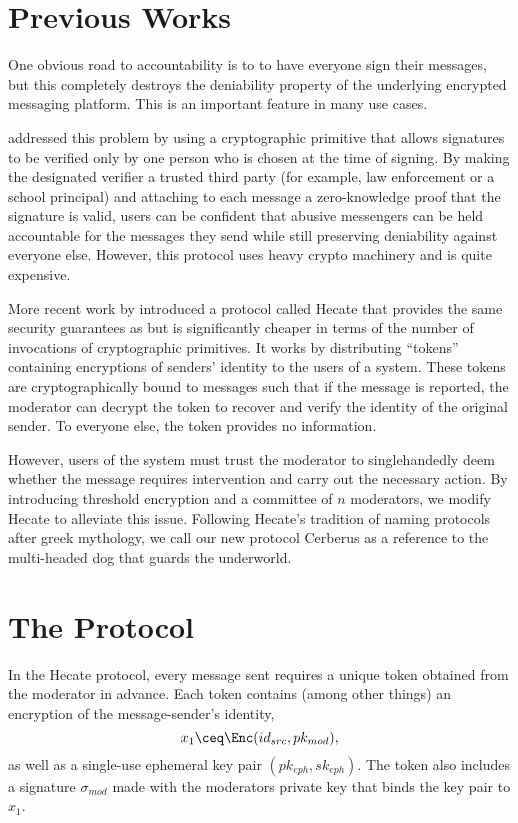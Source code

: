 \documentclass[conference]{IEEEtran}
\begin{document}
\section{Previous Works}

One obvious road to accountability is to to have everyone sign their messages, but this completely destroys the deniability property of the underlying encrypted messaging platform. This is an important feature in many use cases.

\textcite{tglmr} addressed this problem by using a cryptographic primitive that allows signatures to be verified only by one person who is chosen at the time of signing.
By making the designated verifier a trusted third party (for example, law enforcement or a school principal) and attaching to each message a zero-knowledge proof that the signature is valid, users can be confident that abusive messengers can be held accountable for the messages they send while still preserving deniability against everyone else.
However, this protocol uses heavy crypto machinery and is quite expensive.

More recent work by \textcite{hecate} introduced a protocol called Hecate that provides the same security guarantees as \textcite{tglmr} but is significantly cheaper in terms of the number of invocations of cryptographic primitives.
It works by distributing ``tokens'' containing encryptions of senders' identity to the users of a system.
These tokens are cryptographically bound to messages such that if the message is reported, the moderator can decrypt the token to recover and verify the identity of the original sender.
To everyone else, the token provides no information.

However, users of the system must trust the moderator to singlehandedly deem whether the message requires intervention and carry out the necessary action.
By introducing threshold encryption and a committee of $n$ moderators, we modify Hecate to alleviate this issue.
Following Hecate's tradition of naming protocols after greek mythology, we call our new protocol Cerberus as a reference to the multi-headed dog that guards the underworld.

\section{The Protocol}

In the Hecate protocol, every message sent requires a unique token obtained from the moderator in advance.
Each token contains (among other things) an encryption of the message-sender's identity,
\begin{equation}
	x_1 \ceq \Enc(id_{src}, pk_{mod}),
\end{equation}
as well as a single-use ephemeral key pair $(pk_{eph}, sk_{eph})$.
The token also includes a signature $\sigma_{mod}$ made with the moderators private key that binds the key pair to $x_1$.
\end{document}
